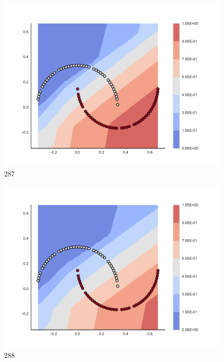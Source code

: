 \begin{subfigure}[b]{0.09\textwidth}
    \includegraphics[clip, trim=2.35cm 1.75cm 4.5cm 0cm,width=\textwidth]{img/convergence/287.pdf}
    \caption{287}
    \label{fig:convergence_287}
\end{subfigure}
%
\begin{subfigure}[b]{0.09\textwidth}
    \includegraphics[clip, trim=2.35cm 1.75cm 4.5cm 0cm,width=\textwidth]{img/convergence/288.pdf}
    \caption{288}
    \label{fig:convergence_288}
\end{subfigure}
%
